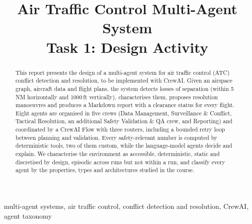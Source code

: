 \documentclass[conference,onecolumn,a4paper,11pt]{IEEEtran}
\begin{document}
\title{Air Traffic Control Multi-Agent System\\
       \large Task 1: Design Activity}

\author{
}

\maketitle
\thispagestyle{plain}
\pagestyle{plain}

\begin{abstract}
This report presents the design of a multi-agent system for air traffic control (ATC) conflict detection and resolution, to be implemented with CrewAI. Given an airspace graph, aircraft data and flight plans, the system detects losses of separation (within 5\,NM horizontally and 1000\,ft vertically), characterises them, proposes resolution manoeuvres and produces a Markdown report with a clearance status for every flight. Eight agents are organised in five crews (Data Management, Surveillance \& Conflict, Tactical Resolution, an additional Safety Validation \& QA crew, and Reporting) and coordinated by a CrewAI Flow with three routers, including a bounded retry loop between planning and validation. Every safety-relevant number is computed by deterministic tools, two of them custom, while the language-model agents decide and explain. We characterise the environment as accessible, deterministic, static and discretised by design, episodic across runs but not within a run, and classify every agent by the properties, types and architectures studied in the course.
\end{abstract}

\begin{IEEEkeywords}
multi-agent systems, air traffic control, conflict detection and resolution, CrewAI, agent taxonomy
\end{IEEEkeywords}

\tableofcontents




\end{document}
